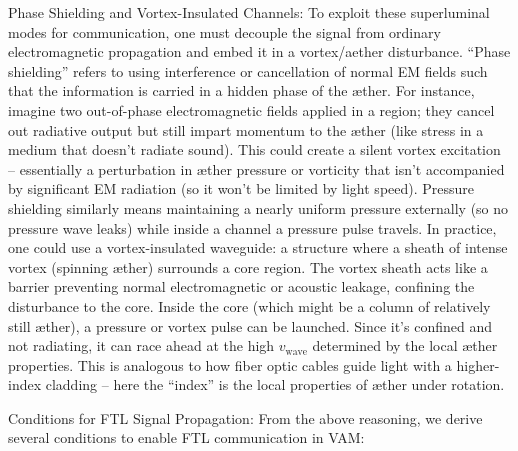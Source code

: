 Phase Shielding and Vortex-Insulated Channels: To exploit these superluminal modes for communication, one must decouple the signal from ordinary electromagnetic propagation and embed it in a vortex/aether disturbance. “Phase shielding” refers to using interference or cancellation of normal EM fields such that the information is carried in a hidden phase of the æther. For instance, imagine two out-of-phase electromagnetic fields applied in a region; they cancel out radiative output but still impart momentum to the æther (like stress in a medium that doesn’t radiate sound). This could create a silent vortex excitation – essentially a perturbation in æther pressure or vorticity that isn’t accompanied by significant EM radiation (so it won’t be limited by light speed). Pressure shielding similarly means maintaining a nearly uniform pressure externally (so no pressure wave leaks) while inside a channel a pressure pulse travels. In practice, one could use a vortex-insulated waveguide: a structure where a sheath of intense vortex (spinning æther) surrounds a core region. The vortex sheath acts like a barrier preventing normal electromagnetic or acoustic leakage, confining the disturbance to the core. Inside the core (which might be a column of relatively still æther), a pressure or vortex pulse can be launched. Since it’s confined and not radiating, it can race ahead at the high $v_{\text{wave}}$ determined by the local æther properties. This is analogous to how fiber optic cables guide light with a higher-index cladding – here the “index” is the local properties of æther under rotation.


Conditions for FTL Signal Propagation: From the above reasoning, we derive several conditions to enable FTL communication in VAM:


